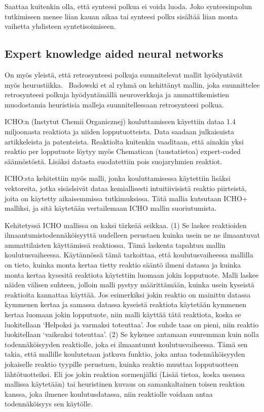 \documentclass[finnish,twoside,censored,subject,sw-line]{HYthesisML}
\begin{document}
Saattaa kuitenkin olla, että synteesi polkua ei voida luoda. Joko synteesinpolun tutkimiseen menee liian kauan
aikaa tai synteesi polku sisältää liian monta vaihetta yhdisteen syntetisoimiseen.

\subsection{Expert knowledge aided neural networks}

On myös yleistä, että retrosynteesi polkuja  suunnitelevat mallit hyödyntävät myös heurustiikka.~\cite{ExpertKnowledgeRetorsynthesis}
Badowski et al ryhmä on kehittänyt mallin, joka suunnittelee retrosynteesi polkuja hyödyntämällä neuroverkkoja ja ammattikemistien muodostamia heuristisia malleja suunnitellessaan retrosynteesi polkua.

ICHO:n (Instytut Chemii Organicznej) kouluttamiseen käyettiin dataa 1.4 miljoonasta reaktiota ja niiden lopputuotteista.
Data saadaan julkaisuista artikkeleista ja patenteista.
Reaktiolta kuitenkin vaaditaan, että ainakin yksi reaktio per lopputuote löytyy myös Chematican (taustatietoa) expert-coded säännöstöstä.
Lisäksi datasta suodatettiin pois suojaryhmien reaktiot.

ICHO:sta kehitettiin myös malli, jonka kouluttamisessa käytettiin lisäksi vektoreita, jotka sisäslsivät dataa kemiallisesti intuitiivisistä reaktio piirteistä, joita on käytetty aikaisemmissa tutkimuksissa.
Tätä mallia kutsutaan ICHO+ malliksi, ja sitä käytetään vertailemaan ICHO mallin suoriutumista.

Kehitetyssä ICHO mallissa on kaksi tärkeää seikkaa.
(1) Se laskee reaktioiden ilmaantumistodennäköisyyttä uudelleen perustaen kuinka usein ne ne ilmaantuvat ammattilaisten käyttämissä reaktiossa.
Tämä laskenta tapahtuu mallin koulutusvaiheessa.
Käytännössä tämä tarkoittaa, että koulutusvaiheessa mallilla on tieto, kuinka monta kertaa tietty reaktio sääntö ilmeni datassa ja kuinka monta kertaa kysesitä reaktiota käytettiin luomaan jokin lopputuote.
Malli laskee näiden välisen suhteen, jolloin malli pystyy määrittämään, kuinka usein kyseistä reaktioita kannattaa käyttää.
Jos esimerkiksi jokin reaktio on mainittu datassa kymmenen kertaa ja samassa datassa kyseistä reaktiota käytetään kymmenen kertaa luomaan jokin lopputuote, niin malli käyttää tätä reaktiota, koska se luokitellaan `Helpoksi ja varmaksi toteuttaa'.
Jos suhde taas on pieni, niin reaktio luokitellaan `vaikeaksi toteuttaa'.
(2) Se kykenee antamaan suuremman kuin nolla todennäköisyyden reaktiolle, joka ei ilmaantunut koulutusvaiheessa.
Tämä sen takia, että mallille koulutetaan jatkuva funktio, joka antaa todennäköisyyden jokaiselle reaktio tyypille perustuen, kuinka reaktio muuttaa lopputuotteen lähtötuotteiksi.
Eli jos jokin reaktion sormenjälki (Lisää tietoa, koska useassa mallissa käytetään) tai heuristinen kuvaus on samankaltainen toisen reaktion kanssa, joka ilmenee koulutusdatassa, niin reaktiolle voidaan antaa todennäköisyys sen käytölle.
\end{document}
